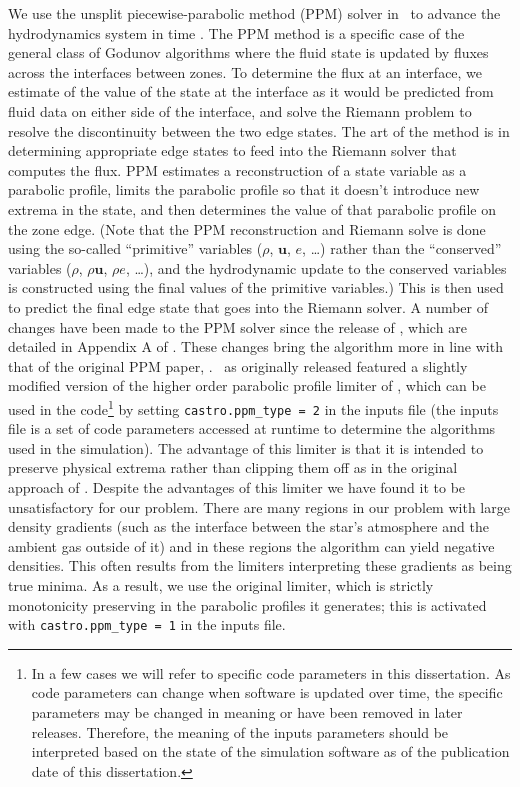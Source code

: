 \documentclass[12pt]{article}
\begin{document}
We use the unsplit piecewise-parabolic method (PPM) solver in \castro\
to advance the hydrodynamics system in time \citep{ppmunsplit}. The PPM method
is a specific case of the general class of Godunov algorithms \citep{godunov:1959}
where the fluid state is updated by fluxes across the interfaces between zones.
To determine the flux at an interface, we estimate of the value of the state at
the interface as it would be predicted from fluid data on either side of the interface,
and solve the Riemann problem to resolve the discontinuity between the two edge
states. The art of the method is in determining appropriate edge states to feed into
the Riemann solver that computes the flux. PPM estimates a reconstruction of a
state variable as a parabolic profile, limits the parabolic profile so that it doesn't
introduce new extrema in the state, and then determines the value of that
parabolic profile on the zone edge. (Note that the PPM reconstruction and Riemann solve
is done using the so-called ``primitive'' variables ($\rho$, $\mathbf{u}$, $e$, \ldots) rather
than the ``conserved'' variables ($\rho$, $\rho \mathbf{u}$, $\rho e$, \ldots), and the
hydrodynamic update to the conserved variables is constructed using the final values of the primitive
variables.) This is then used to predict the final edge state
that goes into the Riemann solver. A number of changes have been made to the
PPM solver since the release of \castro, which are detailed in Appendix A of
\cite{wdmergerI}. These changes bring the algorithm more in line with that of
the original PPM paper, \cite{ppm}. \castro\ as originally released featured a slightly modified
version of the higher order parabolic profile limiter of \cite{colella-sekora:2008},
which can be used in the code\footnote{In a few cases we will refer to
specific code parameters in this dissertation. As code parameters can change
when software is updated over time, the specific parameters may be changed
in meaning or have been removed in later releases. Therefore, the meaning
of the inputs parameters should be interpreted based on the state of the
simulation software as of the publication date of this dissertation.} by
setting \texttt{castro.ppm\_type = 2} in the inputs file (the inputs file is
a set of code parameters accessed at runtime to determine the algorithms
used in the simulation). The advantage of this limiter is that it is intended
to preserve physical extrema rather than clipping them off as in the
original approach of \cite{ppm}. Despite the advantages of this limiter 
we have found it to be unsatisfactory for our problem. There are many regions in our
problem with large density gradients (such as the interface between
the star's atmosphere and the ambient gas outside of it) and in these
regions the algorithm can yield negative densities. This often results
from the limiters interpreting these gradients as being true minima.
As a result, we use the original limiter, which is strictly monotonicity
preserving in the parabolic profiles it generates; this is activated with
\texttt{castro.ppm\_type = 1} in the inputs file.
\end{document}
